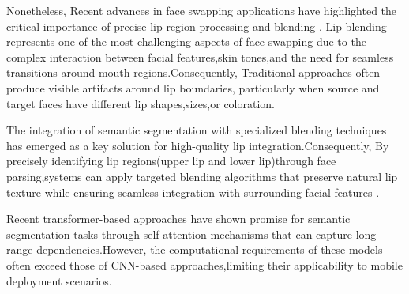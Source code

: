 \documentclass[12pt,a4paper]{report}
\begin{document}
Nonetheless, Recent advances in face swapping applications have highlighted the critical importance of precise lip region processing and blending \cite{li2020face}. Lip blending represents one of the most challenging aspects of face swapping due to the complex interaction between facial features,skin tones,and the need for seamless transitions around mouth regions.Consequently, Traditional approaches often produce visible artifacts around lip boundaries, particularly when source and target faces have different lip shapes,sizes,or coloration.

The integration of semantic segmentation with specialized blending techniques has emerged as a key solution for high-quality lip integration.Consequently, By precisely identifying lip regions(upper lip and lower lip)through face parsing,systems can apply targeted blending algorithms that preserve natural lip texture while ensuring seamless integration with surrounding facial features \cite{wang2021facex}. 

Recent transformer-based approaches \cite{dosovitskiy2020image} have shown promise for semantic segmentation tasks through self-attention mechanisms that can capture long-range dependencies.However, the computational requirements of these models often exceed those of CNN-based approaches,limiting their applicability to mobile deployment scenarios.
\end{document}
